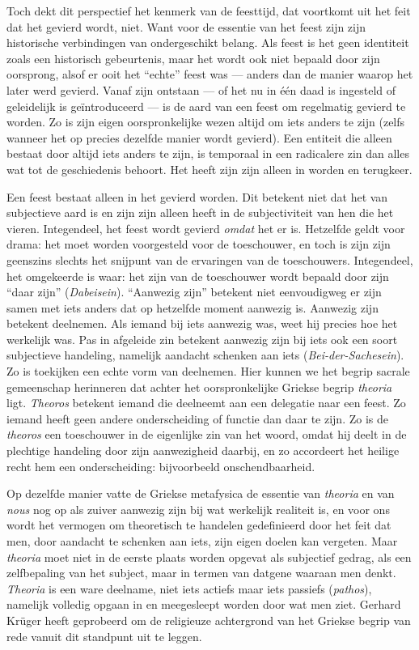 Toch dekt dit perspectief het kenmerk van de feesttijd, dat voortkomt uit het feit dat het gevierd wordt, niet. Want voor de essentie van het feest zijn zijn historische verbindingen van ondergeschikt belang. Als feest is het geen identiteit zoals een historisch gebeurtenis, maar het wordt ook niet bepaald door zijn oorsprong, alsof er ooit het ``echte'' feest was — anders dan de manier waarop het later werd gevierd. Vanaf zijn ontstaan — of het nu in één daad is ingesteld of geleidelijk is geïntroduceerd — is de aard van een feest om regelmatig gevierd te worden. Zo is zijn eigen oorspronkelijke wezen altijd om iets anders te zijn (zelfs wanneer het op precies dezelfde manier wordt gevierd). Een entiteit die alleen bestaat door altijd iets anders te zijn, is temporaal in een radicalere zin dan alles wat tot de geschiedenis behoort. Het heeft zijn zijn alleen in worden en terugkeer.

Een feest bestaat alleen in het gevierd worden. Dit betekent niet dat het van subjectieve aard is en zijn zijn alleen heeft in de subjectiviteit van hen die het vieren. Integendeel, het feest wordt gevierd \textit{omdat} het er is. Hetzelfde geldt voor drama: het moet worden voorgesteld voor de toeschouwer, en toch is zijn zijn geenszins slechts het snijpunt van de ervaringen van de toeschouwers. Integendeel, het omgekeerde is waar: het zijn van de toeschouwer wordt bepaald door zijn ``daar zijn'' (\textit{Dabeisein}). ``Aanwezig zijn'' betekent niet eenvoudigweg er zijn samen met iets anders dat op hetzelfde moment aanwezig is. Aanwezig zijn betekent deelnemen. Als iemand bij iets aanwezig was, weet hij precies hoe het werkelijk was. Pas in afgeleide zin betekent aanwezig zijn bij iets ook een soort subjectieve handeling, namelijk aandacht schenken aan iets (\textit{Bei-der-Sachesein}). Zo is toekijken een echte vorm van deelnemen. Hier kunnen we het begrip sacrale gemeenschap herinneren dat achter het oorspronkelijke Griekse begrip \textit{theoria} ligt. \textit{Theoros} betekent iemand die deelneemt aan een delegatie naar een feest. Zo iemand heeft geen andere onderscheiding of functie dan daar te zijn. Zo is de \textit{theoros} een toeschouwer in de eigenlijke zin van het woord, omdat hij deelt in de plechtige handeling door zijn aanwezigheid daarbij, en zo accordeert het heilige recht hem een onderscheiding: bijvoorbeeld onschendbaarheid.

Op dezelfde manier vatte de Griekse metafysica de essentie van \textit{theoria} en van \textit{nous} nog op als zuiver aanwezig zijn bij wat werkelijk realiteit is, en voor ons wordt het vermogen om theoretisch te handelen gedefinieerd door het feit dat men, door aandacht te schenken aan iets, zijn eigen doelen kan vergeten. Maar \textit{theoria} moet niet in de eerste plaats worden opgevat als subjectief gedrag, als een zelfbepaling van het subject, maar in termen van datgene waaraan men denkt. \textit{Theoria} is een ware deelname, niet iets actiefs maar iets passiefs (\textit{pathos}), namelijk volledig opgaan in en meegesleept worden door wat men ziet. Gerhard Krüger heeft geprobeerd om de religieuze achtergrond van het Griekse begrip van rede vanuit dit standpunt uit te leggen.

